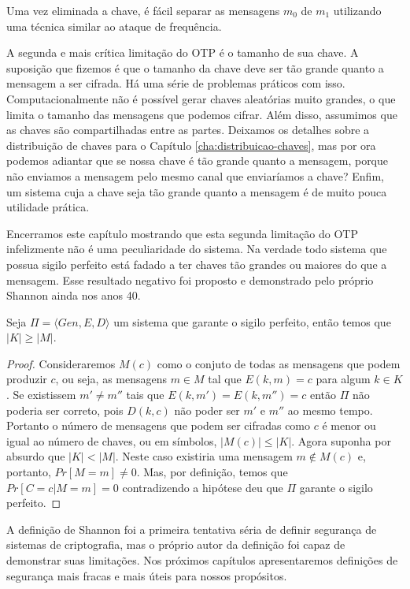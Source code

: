 Uma vez eliminada a chave, é fácil separar as mensagens $m_0$ de $m_1$ utilizando uma técnica similar ao ataque de frequência.

A segunda e mais crítica limitação do OTP é o tamanho de sua chave.
A suposição que fizemos é que o tamanho da chave deve ser tão grande quanto a mensagem a ser cifrada.
Há uma série de problemas práticos com isso.
Computacionalmente não é possível gerar chaves aleatórias muito grandes, o que limita o tamanho das mensagens que podemos cifrar.
Além disso, assumimos que as chaves são compartilhadas entre as partes.
Deixamos os detalhes sobre a distribuição de chaves para o Capítulo \ref{cha:distribuicao-chaves}, mas por ora podemos adiantar que se nossa chave é tão grande quanto a mensagem, porque não enviamos a mensagem pelo mesmo canal que enviaríamos a chave?
Enfim, um sistema cuja a chave seja tão grande quanto a mensagem é de muito pouca utilidade prática.

Encerramos este capítulo mostrando que esta segunda limitação do OTP infelizmente não é uma peculiaridade do sistema.
Na verdade todo sistema que possua sigilo perfeito está fadado a ter chaves tão grandes ou maiores do que a mensagem.
Esse resultado negativo foi proposto e demonstrado pelo próprio Shannon ainda nos anos 40.


\begin{theorem}[Shannon]
Seja $\Pi = \langle Gen, E, D \rangle$ um sistema que garante o sigilo perfeito, então temos que $|K| \geq |M|$.
\end{theorem}
\begin{proof}
  Consideraremos $M(c)$ como o conjuto de todas as mensagens que podem produzir $c$, ou seja, as mensagens $m \in M$ tal que $E(k, m) = c$ para algum $k \in K$.
  Se existissem $m' \neq m''$ tais que $E(k, m') = E(k, m'') = c$ então $\Pi$ não poderia ser correto, pois $D(k, c)$ não poder ser $m'$ e $m''$ ao mesmo tempo.
  Portanto o número de mensagens que podem ser cifradas como $c$ é menor ou igual ao número de chaves, ou em símbolos, $|M(c)| \leq |K|$.
  Agora suponha por absurdo que $|K| < |M|$.
  Neste caso existiria uma mensagem $m \notin M(c)$ e, portanto, $Pr[M = m] \neq 0$.
  Mas, por definição, temos que $Pr[C = c | M = m] = 0$ contradizendo a hipótese deu que $\Pi$ garante o sigilo perfeito.
\end{proof}

A definição de Shannon foi a primeira tentativa séria de definir segurança de sistemas de criptografia, mas o próprio autor da definição foi capaz de demonstrar suas limitações.
Nos próximos capítulos apresentaremos definições de segurança mais fracas e mais úteis para nossos propósitos.

